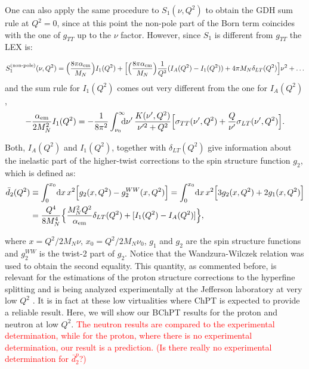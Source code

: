 \documentclass[twocolumn,prc,showpacs,nofootinbib,preprintnumbers,amsmath,amssymb,superscriptaddress]{revtex4-1}
\def\dd{\mathrm{d}}
\begin{document}
One can also apply the same procedure to $S_1(\nu,Q^2)$ to obtain the GDH sum rule at $Q^2=0$, since at this point the non-pole part of the Born term coincides with the one of $g_{TT}$ up to the $\nu$ factor. 
However, since  $S_1$ is different from $g_{TT}$ the LEX is: 
\begin{widetext}
\begin{align}
S_1^{\text{(non-pole)}}(\nu,Q^2) =  \Big( \frac{8\pi\alpha_{\rm em}}{M_N} \Big)  I_1(Q^2) + \Big[ \Big(\frac{8\pi \alpha_{\rm em}}{M_N} \Big) \frac{1}{Q^2} (I_A(Q^2) - I_1(Q^2)) + 4\pi M_N \delta_{LT}(Q^2) \Big]\nu^2 + \dots\label{Eq:LEX-S1np}
\end{align}
and the sum rule for $I_1(Q^2)$ comes out very different from the one for $I_A(Q^2)$,
\begin{align}
-\frac{\alpha_{\rm em}}{2 M_N^2}I_1(Q^2) = -\frac{1}{8 \pi^2} \int_{\nu_0}^\infty \!\!\!\! \dd\nu'\, \frac{K(\nu',Q^2)}{\nu'^2+Q^2} \Big[ \sigma_{TT} (\nu',Q^2) + \frac{Q}{\nu'} \sigma_{LT} (\nu',Q^2)\Big]. \label{Eq:I1-SumRule}
\end{align}

Both, $I_A(Q^2)$ and $I_1(Q^2)$, together with $\delta_{LT}(Q^2)$ give information about the inelastic part of the higher-twist corrections to the spin structure function $g_2$, which is defined as: 
\begin{align}\label{Eq:d2inelDef}
 \bar{d}_2(Q^2) & \equiv \int_0^{x_0}\! \dd x \, x^2\Big[ g_2(x,Q^2) - g_2^{WW}(x,Q^2) \Big] = \int_0^{x_0}\! \dd x \, x^2\Big[ 3 g_2(x,Q^2) + 2 g_1(x,Q^2) \Big] \nonumber\\
 &= \frac{Q^4}{8 M_N^4}\Big\{ \frac{M_N^2 Q^2}{\alpha_{\rm em}}\delta_{LT}(Q^2) +[I_1(Q^2) - I_A(Q^2)] \Big\},
\end{align}
\end{widetext}
where $x=Q^2/2M_N \nu$, $x_0=Q^2/2M_N \nu_0$, $g_1$ and $g_2$ are the spin structure functions and $g_2^{WW}$ is the twist-2 part of $g_2$.
Notice that the Wandzura-Wilczek relation \cite{Wandzura:1977qf} was used to obtain the second equality.
This quantity, as commented before, is relevant for the estimations of the proton structure corrections to the hyperfine splitting and is being analyzed experimentally at the Jefferson laboratory at very low $Q^2$ \cite{Exp-new-E08-027,Exp-new-E97-110}.
It is in fact at these low virtualities where ChPT is expected to provide a reliable result.
Here, we will show our BChPT results for the proton and neutron at low $Q^2$.
\textcolor{red}{The neutron results are compared to the experimental determination, while for the proton, where there is no experimental determination, our result is a prediction. (Is there really no experimental determination for $\bar{d}_2^p$?)}
\end{document}
